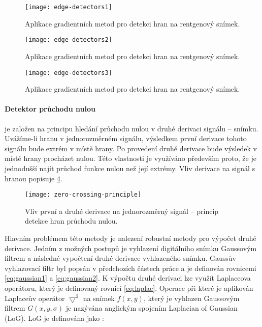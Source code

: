 \begin{figure}[ht]
\centering
\texttt{[image: edge-detectors1]}
\caption{Aplikace gradientních metod pro detekci hran na rentgenový snímek.}
\label{fig:edge-detector1}
\end{figure}

\begin{figure}[ht]
\centering
\texttt{[image: edge-detectors2]}
\caption{Aplikace gradientních metod pro detekci hran na rentgenový snímek.}
\label{fig:edge-detector2}
\end{figure}

\begin{figure}[ht]
\centering
\texttt{[image: edge-detectors3]}
\caption{Aplikace gradientních metod pro detekci hran na rentgenový snímek.}
\label{fig:edge-detector3}
\end{figure}

\clearpage

\paragraph{Detektor průchodu nulou} je založen na principu hledání průchodu nulou v druhé derivaci signálu -- snímku. Uvážíme-li hranu v jednorozměrném signálu, výsledkem první derivace tohoto signálu bude extrém v místě hrany. Po provedení druhé derivace bude výsledek v místě hrany procházet nulou. Této vlastnosti je využíváno především proto, že je jednodušší najít průchod funkce nulou než její extrémy. Vliv derivace na signál s hranou popisuje \cref{fig:zero-crossing-principle}.

\begin{figure}[ht]
\centering
\texttt{[image: zero-crossing-principle]}
\caption{Vliv první a druhé derivace na jednorozměrný signál -- princip detekce hran průchodu nulou. \cite[str.~138]{Image-Processing-Analysis-and-Machine-Vision}}
\label{fig:zero-crossing-principle}
\end{figure}

Hlavním problémem této metody je nalezení robustní metody pro výpočet druhé derivace. Jedním z možných postupů je vyhlazení digitálního snímku Gaussovým filtrem a následné vypočtení druhé derivace vyhlazeného snímku. Gaussův vyhlazovací filtr byl popsán v předchozích částech práce a je definován rovnicemi \ref{eq:gaussian1} a \ref{eq:gaussian2}. K výpočtu druhé derivaci lze využít Laplaceova operátoru, který je definovaný rovnicí \ref{eq:laplac}.  Operace při které je aplikován Laplaceův operátor $\bigtriangledown ^2$ na snímek $f(x,y)$, který je vyhlazen Gaussovým filtrem $G(x, y,\sigma )$ je nazývána anglickým spojením Laplacian of Gaussian (LoG). LoG je definována  jako \cite[str.~139]{Image-Processing-Analysis-and-Machine-Vision}:

